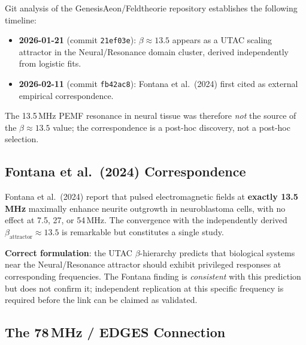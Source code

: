 \documentclass[12pt,a4paper]{article}
\theoremstyle{definition}
\begin{document}
\begin{validated}
Git analysis of the GenesisAeon/Feldtheorie repository establishes the following
timeline:
\begin{itemize}[leftmargin=1.8em]
  \item \textbf{2026-01-21} (commit \texttt{21ef03e}):
        $\beta \approx 13.5$ appears as a UTAC scaling attractor in the
        Neural/Resonance domain cluster, derived independently from logistic fits.
  \item \textbf{2026-02-11} (commit \texttt{fb42ac8}):
        Fontana et al.\ (2024) first cited as external empirical correspondence.
\end{itemize}
The 13.5\,MHz PEMF resonance in neural tissue was therefore \emph{not} the source
of the $\beta \approx 13.5$ value; the correspondence is a post-hoc discovery,
not a post-hoc selection.
\end{validated}

\subsection{Fontana et al.\ (2024) Correspondence}

\begin{hypothesis}
Fontana et al.\ (2024) report that pulsed electromagnetic fields at
\textbf{exactly 13.5\,MHz} maximally enhance neurite outgrowth in neuroblastoma
cells, with no effect at 7.5, 27, or 54\,MHz.
The convergence with the independently derived $\beta_{\mathrm{attractor}} \approx 13.5$
is remarkable but constitutes a single study.

\textbf{Correct formulation}: the UTAC $\beta$-hierarchy predicts that biological
systems near the Neural/Resonance attractor should exhibit privileged responses at
corresponding frequencies. The Fontana finding is \emph{consistent} with this
prediction but does not confirm it; independent replication at this specific
frequency is required before the link can be claimed as validated.
\end{hypothesis}

\subsection{The 78\,MHz / EDGES Connection}
\end{document}
